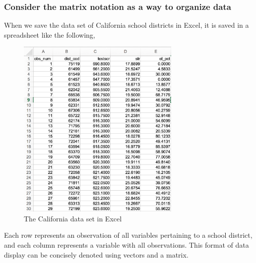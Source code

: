 \documentclass[a4paper,11pt]{article}
\begin{document}
\subsubsection*{Consider the matrix notation as a way to organize data}
\label{sec:orgec2fbb6}
When we save the data set of California school districts in Excel, it
is saved in a spreadsheet like the following,

\begin{figure}[htbp]
\centering
\includegraphics[width=0.7\textwidth]{img/data_snapshot.png}
\caption{\label{fig:org7ffc0db}
The California data set in Excel}
\end{figure}

Each row represents an observation of all variables pertaining to a
school district, and each column represents a variable with all
observations. This format of data display can be concisely denoted
using vectors and a matrix.
\end{document}
